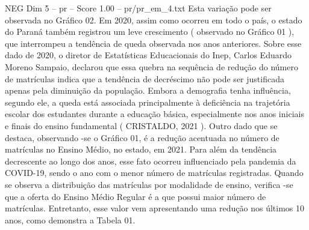 \begin{textsample}{NEG Dim 5 – pr – Score 1.00 – pr/pr\_em\_4.txt}
Esta variação pode ser observada no Gráfico 02.
Em 2020, assim como ocorreu em todo o país, o estado do Paraná também registrou um leve crescimento ( observado no Gráfico 01 ), que interrompeu a tendência de queda observada nos anos anteriores.
Sobre esse dado de 2020, o diretor de Estatísticas Educacionais do Inep, Carlos Eduardo Moreno Sampaio, declarou que essa quebra na sequência de redução do número de matrículas indica que a tendência de decréscimo não pode ser justificada apenas pela diminuição da população.
Embora a demografia tenha influência, segundo ele, a queda está associada principalmente à deficiência na trajetória escolar dos estudantes durante a educação básica, especialmente nos anos iniciais e finais do ensino fundamental ( CRISTALDO, 2021 ).
Outro dado que se destaca, observando -se o Gráfico 01, é a redução acentuada no número de matrículas no Ensino Médio, no estado, em 2021.
Para além da tendência decrescente ao longo dos anos, esse fato ocorreu influenciado pela pandemia da COVID-19, sendo o ano com o menor número de matrículas registradas.
Quando se observa a distribuição das matrículas por modalidade de ensino, verifica -se que a oferta do Ensino Médio Regular é a que possui maior número de matrículas.
Entretanto, esse valor vem apresentando uma redução nos últimos 10 anos, como demonstra a Tabela 01.

\end{textsample}
